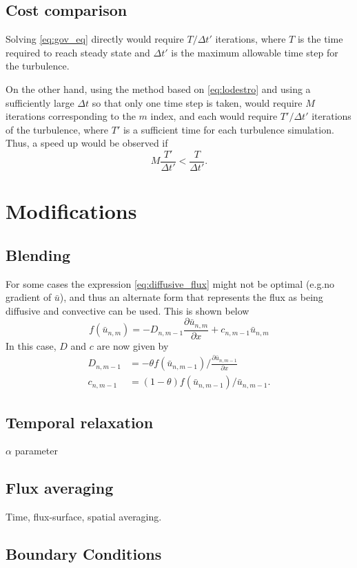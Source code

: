 \documentclass{article}
\begin{document}
\subsection{Cost comparison}
Solving \cref{eq:gov_eq} directly would require $T / \Delta t'$ iterations, where $T$ is the time required to reach steady state and $\Delta t'$ is the maximum allowable time step for the turbulence.

On the other hand, using the method based on \cref{eq:lodestro} and using a sufficiently large $\Delta t$ so that only one time step is taken, would require $M$ iterations corresponding to the $m$ index, and each would require $T' / \Delta t'$ iterations of the turbulence, where $T'$ is a sufficient time for each turbulence simulation. Thus, a speed up would be observed if
\begin{equation}
    M \frac{T'}{\Delta t'} < \frac{T}{\Delta t'}.
\end{equation}

\section{Modifications}
\subsection{Blending}
For some cases the expression \cref{eq:diffusive_flux} might not be optimal (e.g.\@ no gradient of $\bar{u}$), and thus an alternate form that represents the flux as being diffusive and convective can be used. This is shown below
\begin{equation}
\label{eq:diffusive_convective_flux}
    f(\bar{u}_{n,m}) = -D_{n,m-1} \frac{\partial \bar{u}_{n,m}}{\partial x} + c_{n,m-1} \bar{u}_{n,m}
\end{equation}
In this case, $D$ and $c$ are now given by
\begin{align}
    D_{n,m-1} &= - \theta f(\bar{u}_{n,m-1}) \bigg/ \frac{ \partial \bar{u}_{n,m-1}}{\partial x} \\
    c_{n,m-1} &= (1 - \theta) f(\bar{u}_{n,m-1}) / \bar{u}_{n,m-1}.
\end{align}


\subsection{Temporal relaxation}
$\alpha$ parameter

\subsection{Flux averaging}
Time, flux-surface, spatial averaging.

\subsection{Boundary Conditions}
\end{document}
